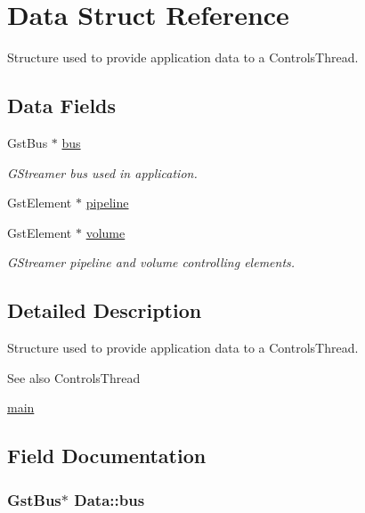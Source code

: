 \hypertarget{structData}{}\section{Data Struct Reference}
\label{structData}


Structure used to provide application data to a Controls\+Thread.  


\subsection*{Data Fields}
\begin{DoxyCompactItemize}
\item 
Gst\+Bus $\ast$ \hyperlink{structData_a2b35ff2f27a570888e9031fd86ef070b}{bus}
\begin{DoxyCompactList}\small\item\em G\+Streamer bus used in application. \end{DoxyCompactList}\item 
Gst\+Element $\ast$ \hyperlink{structData_acc9420301b7625de16e13eefa553fc87}{pipeline}
\item 
Gst\+Element $\ast$ \hyperlink{structData_a6981e07718f31f6b5485075187f41e93}{volume}
\begin{DoxyCompactList}\small\item\em G\+Streamer pipeline and volume controlling elements. \end{DoxyCompactList}\end{DoxyCompactItemize}


\subsection{Detailed Description}
Structure used to provide application data to a Controls\+Thread. 

\begin{DoxySeeAlso}{See also}
Controls\+Thread 

\hyperlink{main_8c_a0ddf1224851353fc92bfbff6f499fa97}{main} 
\end{DoxySeeAlso}


\subsection{Field Documentation}
\subsubsection[{\texorpdfstring{bus}{bus}}]{\setlength{\rightskip}{0pt plus 5cm}Gst\+Bus$\ast$ Data\+::bus}\hypertarget{structData_a2b35ff2f27a570888e9031fd86ef070b}{}\label{structData_a2b35ff2f27a570888e9031fd86ef070b}


